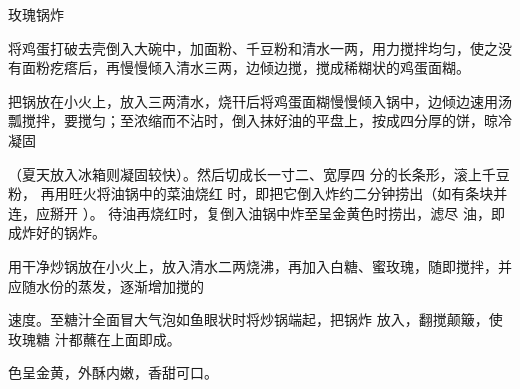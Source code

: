 \begin{recipe}{玫瑰锅炸}

\ingredients


\cooking

\step 将鸡蛋打破去壳倒入大碗中，加面粉、千豆粉和清水一两，用力搅拌均匀，使之没
有面粉疙瘩后，再慢慢倾入清水三两，边倾边搅，搅成稀糊状的鸡蛋面糊。

\step 把锅放在小火上，放入三两清水，烧幵后将鸡蛋面糊慢慢倾入锅中，边倾边速用汤
瓢搅拌，要搅匀；至浓缩而不沾时，倒入抹好油的平盘上，按成四分厚的饼，晾冷凝固

（夏天放入冰箱则凝固较快）。然后切成长一寸二、宽厚四 分的长条形，滚上千豆粉，
再用旺火将油锅中的菜油烧红 时，即把它倒入炸约二分钟捞出（如有条块并连，应掰开
）。 待油再烧红时，复倒入油锅中炸至呈金黄色时捞出，滤尽 油，即成炸好的锅炸。

\step 用干净炒锅放在小火上，放入清水二两烧沸，再加入白糖、蜜玫瑰，随即搅拌，并
应随水份的蒸发，逐渐增加搅的

速度。至糖汁全面冒大气泡如鱼眼状时将炒锅端起，把锅炸 放入，翻搅颠簸，使玫瑰糖
汁都蘸在上面即成。

\features

色呈金黄，外酥内嫩，香甜可口。

\end{recipe}


